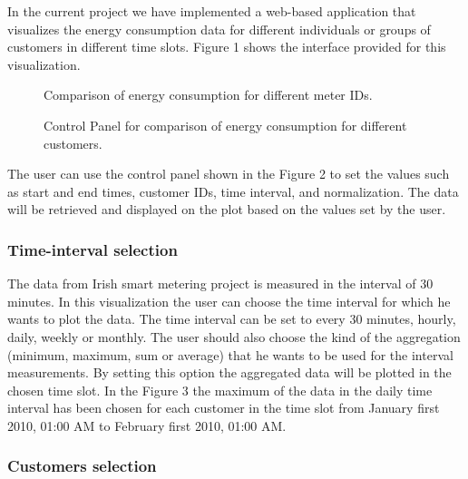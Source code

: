 \documentclass{sig-alternate-10pt}
\begin{document}
In the current project we have implemented a web-based application that visualizes the energy consumption data for different individuals or groups of customers in different time slots. Figure 1 shows the interface provided for this visualization.\\

\begin{figure*}
\centering
{}
\caption{Comparison of energy consumption for different meter IDs.}
\end{figure*}

\begin{figure}
\centering
{}
\caption{Control Panel for comparison of energy consumption for different customers.}
\end{figure}

The user can use the control panel shown in the Figure 2 to set the values such as start and end times, customer IDs, time interval, and normalization. The data will be retrieved and displayed on the plot based on the values set by the user.\\

\subsubsection{Time-interval selection} 

The data from Irish smart metering project is measured in the interval of 30 minutes. In this visualization the user can choose the time interval for which he wants to plot the data. The time interval can be set to every 30 minutes, hourly, daily, weekly or monthly. The user should also choose the kind of the aggregation (minimum, maximum, sum or average) that he wants to be used for the interval measurements. By setting this option the aggregated data will be plotted in the chosen time slot. In the Figure 3 the maximum of the data in the daily time interval has been chosen for each customer in the time slot from January first 2010, 01:00 AM to February first 2010, 01:00 AM.\\

\subsubsection{Customers selection}
  
\end{document}
